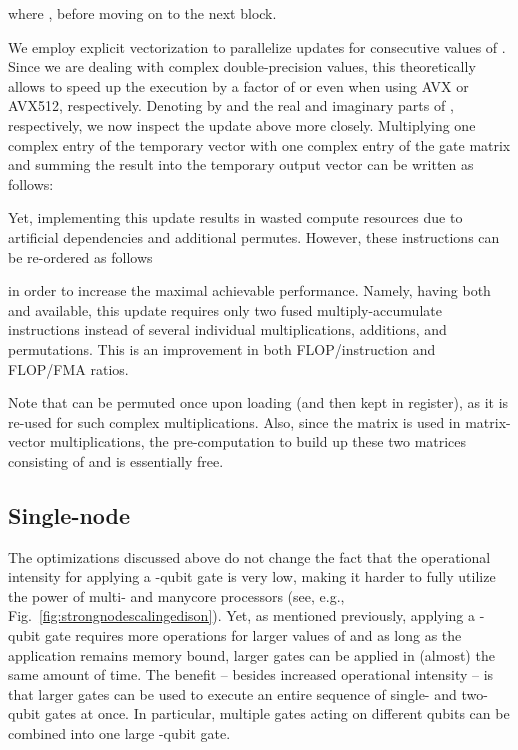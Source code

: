 \documentclass[sigconf]{acmart}
\begin{document}
where , before moving on to the next block.

We employ explicit vectorization to parallelize updates for consecutive values of . Since we are dealing with complex double-precision values, this theoretically allows to speed up the execution by a factor of  or even  when using AVX or AVX512, respectively. Denoting by  and  the real and imaginary parts of , respectively, we now inspect the update above more closely.
Multiplying one complex entry  of the temporary vector  with one complex entry of the gate matrix  and summing the result into the temporary output vector  can be written as follows:

Yet, implementing this update results in wasted compute resources due to artificial dependencies and additional permutes. However, these instructions can be re-ordered as follows

in order to increase the maximal achievable performance. Namely, having both  and  available, this update requires only two fused multiply-accumulate instructions instead of several individual multiplications, additions, and permutations. This is an improvement in both FLOP/instruction and FLOP/FMA ratios.

Note that  can be permuted once upon loading (and then kept in register), as it is re-used for  such complex multiplications. Also, since the matrix  is used in  matrix-vector multiplications, the pre-computation to build up these two matrices consisting of  and  is essentially free.

\subsection{Single-node}\label{sec:singlenode}


The optimizations discussed above do not change the fact that the operational intensity for applying a -qubit gate is very low, making it harder to fully utilize the power of multi- and manycore processors (see, e.g., Fig.~\ref{fig:strongnodescalingedison}). Yet, as mentioned previously, applying a -qubit gate requires more operations for larger values of  and as long as the application remains memory bound, larger gates can be applied in (almost) the same amount of time. The benefit -- besides increased operational intensity -- is that larger gates can be used to execute an entire sequence of single- and two-qubit gates at once. In particular, multiple gates acting on  different qubits can be combined into one large -qubit gate. 
\end{document}
